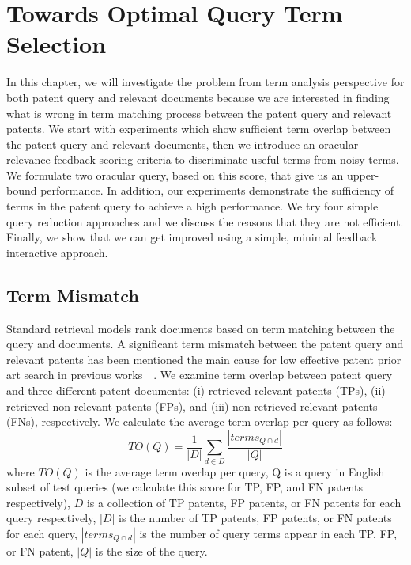 \chapter{Towards Optimal Query Term Selection}
\label{cha:analysis}
In this chapter, we will investigate the problem from term analysis perspective for both patent query and relevant documents because we are interested 
in finding what is wrong in term matching process between the patent query and relevant patents. 
We start with experiments which show sufficient term overlap between the patent query and relevant documents, 
then we introduce an oracular relevance feedback scoring criteria to discriminate useful terms from noisy terms. 
We formulate two oracular query, based on this score, that give us an upper-bound performance. In addition, our experiments demonstrate the sufficiency of terms in the patent query to achieve a high performance. 
We try four simple query reduction approaches and we discuss the reasons that they are not efficient.  
Finally, we show that we can get improved using a simple, minimal feedback interactive approach.

\section{Term Mismatch}
\label{sec:termmismatch}
%
Standard retrieval models rank documents based on term matching between the query and documents.  
A significant term mismatch between the patent query and relevant patents has been mentioned the
main cause for low effective patent prior art search in previous works~\citep{roda2010clef}~\citep{magdy2012toward}. 
We examine term overlap between patent query and three different patent documents: (i) retrieved relevant patents (TPs), (ii) retrieved non-relevant patents (FPs), and (iii) non-retrieved relevant patents (FNs), respectively. We calculate the average term overlap per query as follows:
\begin{equation} 
TO (Q) = \frac{1}{|D|}\sum_{d\in D}\frac{|terms_{Q\cap d}|}{|Q|}
\label{eq:fntermoverlap}
\end{equation}
where $TO(Q)$ is the average term overlap per query, Q is a query in English subset of test queries (we calculate this score for TP, FP, and FN patents respectively), $D$ is a collection of TP patents, FP patents, or FN patents for each query respectively, $|D|$ is the number of TP patents, FP patents, or FN patents for each query, $ |terms_{Q\cap d}| $ is the number of query terms appear in each TP, FP, or FN patent, $ |Q| $ is the size of the query.

